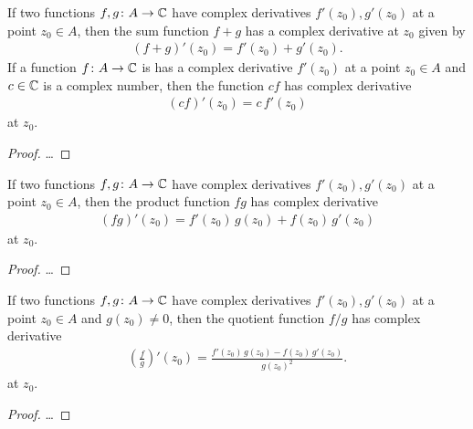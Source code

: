\begin{lemma}
  \label{lem:derivative_linearity}
  If two functions $f, g \colon A \to \mathbb{C}$ have complex derivatives
  $f'(z_0), g'(z_0)$ at a point $z_0 \in A$, then the sum function $f + g$
  has a complex derivative at $z_0$ given by
  \begin{align*}
    (f + g)'(z_0) = f'(z_0) + g'(z_0) .
  \end{align*}
  If a function $f \colon A \to \mathbb{C}$ is has a complex derivative
  $f'(z_0)$ at a point $z_0 \in A$ and $c \in \mathbb{C}$ is a complex number,
  then the function $c f$ has complex derivative
  \begin{align*}
    (c f)'(z_0) = c \, f'(z_0)
  \end{align*}
  at $z_0$.
\end{lemma}
\begin{proof}
  \ldots
\end{proof}

\begin{lemma}
  \label{lem:leibniz_rule}
  If two functions $f, g \colon A \to \mathbb{C}$ have complex derivatives
  $f'(z_0), g'(z_0)$ at a point $z_0 \in A$, then the product function $f g$
  has complex derivative
  \begin{align*}
    (f g)'(z_0) = f'(z_0) \, g(z_0) + f(z_0) \, g'(z_0)
  \end{align*}
  at $z_0$.
\end{lemma}
\begin{proof}
  \ldots
\end{proof}

\begin{lemma}
  \label{lem:quotient_derivative}
  If two functions $f, g \colon A \to \mathbb{C}$ have complex derivatives
  $f'(z_0), g'(z_0)$ at a point $z_0 \in A$ and $g(z_0) \ne 0$, then
  the quotient function $f / g$ has complex derivative
  \begin{align*}
    \left( \frac{f}{g} \right)'(z_0)
      = \frac{f'(z_0) \, g(z_0) - f(z_0) \, g'(z_0)}{g(z_0)^2} .
  \end{align*}
  at $z_0$.
\end{lemma}
\begin{proof}
  \ldots
\end{proof}

